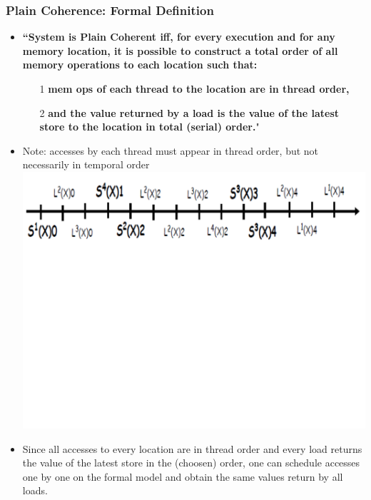\documentclass{beamer}
\begin{document}
\begin{frame}[fragile,t]
\frametitle{Plain Coherence: Formal Definition}

\begin{itemize}
    \item {\bf ``System is Plain Coherent iff, for every execution and for any 
            memory location, it is possible to construct a total order of all memory operations
            to each location such that:}
    \begin{itemize}
        \item[1] {\bf mem ops of each thread to the location are in thread order,}
        \item[2] {\bf and the value returned by a load is the value of the latest store to the location
                in total (serial) order.}"
    \end  {itemize}\medskip


    \item Note: accesses by each thread must appear in thread order, but not necessarily in temporal order\\
            \includegraphics[width=55ex]{Ch7Figs/CoherenceEG2}\vspace{-30ex}
    
    \item Since all accesses to every location are in thread order and every
            load returns the value of the latest store in the (choosen) order,
            one can schedule accesses one by one on the formal model and
            obtain the same values return by all loads. %

\end{itemize}

\end{frame}
\end{document}
